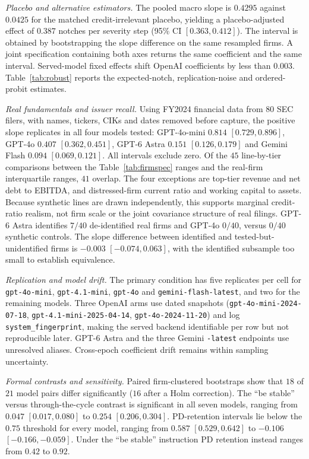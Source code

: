 \documentclass[a4paper,fleqn]{cas-sc}
\begin{document}
\emph{Placebo and alternative estimators.} The pooled macro slope is $0.4295$ against $0.0425$ for the
matched credit-irrelevant placebo, yielding a placebo-adjusted effect of $0.387$ notches per severity
step (95\% CI $[0.363,0.412]$). The interval is obtained by bootstrapping the slope difference on the
same resampled firms. A joint specification containing both axes returns the same coefficient and the
same interval. Served-model fixed effects shift OpenAI coefficients by less than $0.003$.
Table~\ref{tab:robust} reports the expected-notch, replication-noise and ordered-probit estimates.

\emph{Real fundamentals and issuer recall.} Using FY2024 financial data from $80$ SEC filers, with
names, tickers, CIKs and dates removed before capture, the positive slope replicates in all four
models tested: GPT-4o-mini $0.814$ $[0.729,0.896]$, GPT-4o $0.407$ $[0.362,0.451]$, GPT-6 Astra
$0.151$ $[0.126,0.179]$ and Gemini Flash $0.094$ $[0.069,0.121]$. All intervals exclude zero. Of the
$45$ line-by-tier comparisons between the Table~\ref{tab:firmspec} ranges and the real-firm
interquartile ranges, $41$ overlap. The four exceptions are top-tier revenue and net debt to EBITDA,
and distressed-firm current ratio and working capital to assets. Because synthetic lines are drawn
independently, this supports marginal credit-ratio realism, not firm scale or the joint covariance
structure of real filings. GPT-6 Astra identifies $7/40$ de-identified real firms and GPT-4o $0/40$, versus $0/40$ synthetic controls. The slope difference
between identified and tested-but-unidentified firms is $-0.003$ $[-0.074,0.063]$, with the
identified subsample too small to establish equivalence.

\emph{Replication and model drift.} The primary condition has five replicates per cell for
\texttt{gpt-4o-mini}, \texttt{gpt-4.1-mini}, \texttt{gpt-4o} and \texttt{gemini-flash-latest}, and
two for the remaining models. Three OpenAI arms use dated snapshots
(\texttt{gpt-4o-mini-2024-07-18}, \texttt{gpt-4.1-mini-2025-04-14}, \texttt{gpt-4o-2024-11-20}) and
log \texttt{system\_fingerprint}, making the served backend identifiable per row but not reproducible
later. GPT-6 Astra and the three Gemini \texttt{-latest} endpoints use unresolved aliases.
Cross-epoch coefficient drift remains within sampling uncertainty.

\clearpage
\emph{Formal contrasts and sensitivity.} Paired firm-clustered bootstraps show that $18$ of $21$
model pairs differ significantly ($16$ after a Holm correction). The ``be stable'' versus through-the-cycle contrast is significant
in all seven models, ranging from $0.047$ $[0.017,0.080]$ to $0.254$ $[0.206,0.304]$. PD-retention
intervals lie below the $0.75$ threshold for every model, ranging from $0.587$ $[0.529,0.642]$ to
$-0.106$ $[-0.166,-0.059]$. Under the ``be stable'' instruction PD retention instead ranges from $0.42$ to $0.92$.
\end{document}
